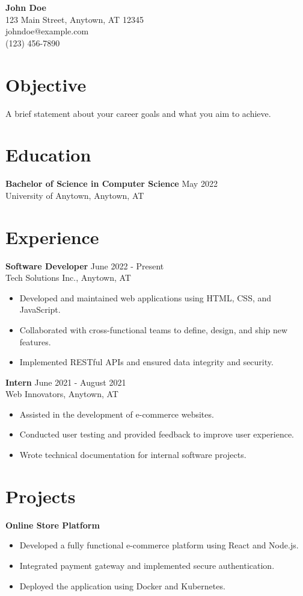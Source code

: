 \documentclass[a4paper,10pt]{article}
\begin{document}
\begin{center}
    {\LARGE \textbf{John Doe}}\\
    \vspace{2mm}
    123 Main Street, Anytown, AT 12345\\
    johndoe@example.com \\
    (123) 456-7890
\end{center}

\section*{Objective}
A brief statement about your career goals and what you aim to achieve.

\section*{Education}
\textbf{Bachelor of Science in Computer Science} May 2022 \\
University of Anytown, Anytown, AT

\section*{Experience}
\textbf{Software Developer} June 2022 - Present \\
Tech Solutions Inc., Anytown, AT
\begin{itemize}
    \item Developed and maintained web applications using HTML, CSS, and JavaScript.
    \item Collaborated with cross-functional teams to define, design, and ship new features.
    \item Implemented RESTful APIs and ensured data integrity and security.
\end{itemize}

\textbf{Intern} June 2021 - August 2021 \\
Web Innovators, Anytown, AT
\begin{itemize}
    \item Assisted in the development of e-commerce websites.
    \item Conducted user testing and provided feedback to improve user experience.
    \item Wrote technical documentation for internal software projects.
\end{itemize}

\section*{Projects}
\textbf{Online Store Platform}
\begin{itemize}
    \item Developed a fully functional e-commerce platform using React and Node.js.
    \item Integrated payment gateway and implemented secure authentication.
    \item Deployed the application using Docker and Kubernetes.
\end{itemize}
\end{document}
